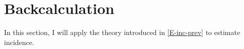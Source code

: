 \documentclass[thesis.tex]{subfiles}
\begin{document}



\section{Backcalculation} \label{backcalc}

In this section, I will apply the theory introduced in \cref{E-inc-prev} to estimate incidence.
\end{document}
